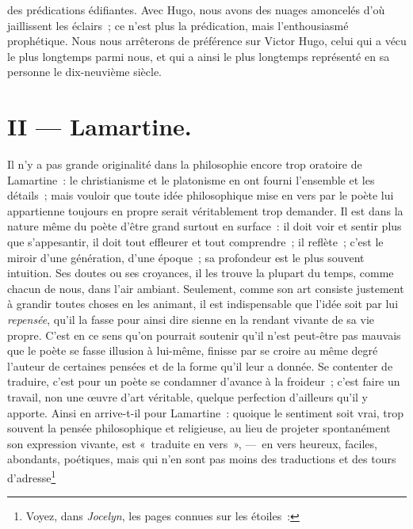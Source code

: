 \documentclass[french,twoside]{book} %
\begin{document}
des prédications édifiantes. Avec Hugo, nous avons des nuages amoncelés d’où jaillissent les éclairs ; ce n’est plus la prédication, mais l’enthousiasmé prophétique. Nous nous arrêterons de préférence sur Victor Hugo, celui qui a vécu le plus longtemps parmi nous, et qui a ainsi le plus longtemps représenté en sa personne le dix-neuvième siècle.
\section[{II — Lamartine.}]{II — Lamartine.}
\noindent Il n’y a pas grande originalité dans la philosophie encore trop oratoire de Lamartine : le christianisme et le platonisme en ont fourni l’ensemble et les détails ; mais vouloir que toute idée philosophique mise en vers par le poète lui appartienne toujours en propre serait véritablement trop demander. Il est dans la nature même du poète d’être grand surtout en surface : il doit voir et sentir plus que s’appesantir, il doit tout effleurer et tout comprendre ; il reflète ; c’est le miroir d’une génération, d’une époque ; sa profondeur est le plus souvent intuition. Ses doutes ou ses croyances, il les trouve la plupart du temps, comme chacun de nous, dans l’air ambiant. Seulement, comme son art consiste justement à grandir toutes choses en les animant, il est indispensable que l’idée soit par lui \emph{repensée}, qu’il la fasse pour ainsi dire sienne en la rendant vivante de sa vie propre. C’est en ce sens qu’on pourrait soutenir qu’il n’est peut-être pas mauvais que le poète se fasse illusion à lui-même, finisse par se croire au même degré l’auteur de certaines pensées et de la forme qu’il leur a donnée. Se contenter de traduire, c’est pour un poète se condamner d’avance à la froideur ; c’est faire un travail, non une œuvre d’art véritable, quelque perfection d’ailleurs qu’il y apporte. Ainsi en arrive-t-il pour Lamartine : quoique le sentiment soit vrai, trop souvent la pensée philosophique et religieuse, au lieu de projeter spontanément son expression vivante, est « traduite en vers », — en vers heureux, faciles, abondants, poétiques, mais qui n’en sont pas moins des traductions et des tours d’adresse\footnote{\noindent Voyez, dans \emph{Jocelyn}, les pages connues sur les étoiles :\par

}
\end{document}
